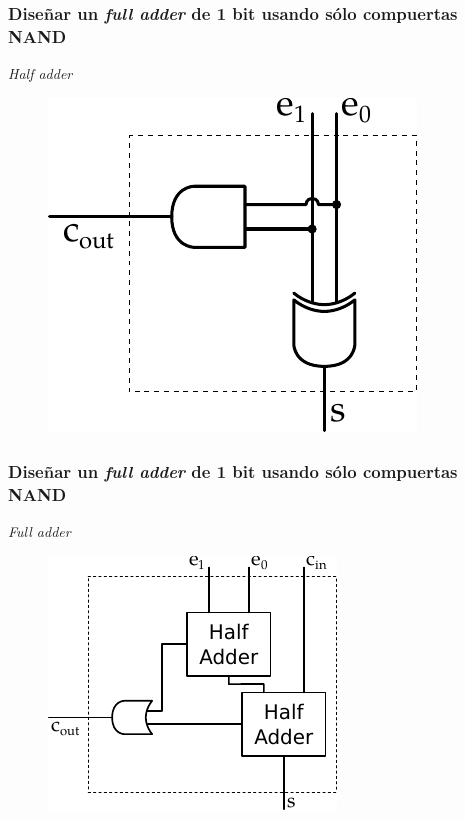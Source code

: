 \documentclass[mathserif,hyperref]{beamer}
\begin{document}
\begin{frame}
\frametitle{\small Diseñar un \textit{full adder} de 1 bit usando sólo
compuertas NAND}
\textit{Half adder}
\begin{figure}[htp]
  \includegraphics[scale=0.9]{halfadder.pdf}
\end{figure}
\end{frame}


\begin{frame}
\frametitle{\small Diseñar un \textit{full adder} de 1 bit usando sólo
compuertas NAND}
\textit{Full adder}
\begin{figure}[htp]
  \includegraphics[scale=0.9]{fulladder.pdf}
\end{figure}
\end{frame}
\end{document}
